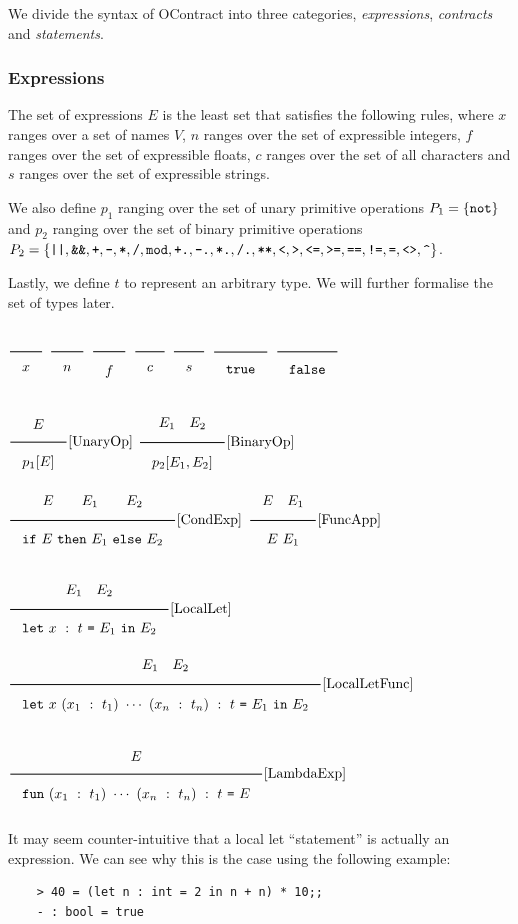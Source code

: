 \documentclass[a4paper]{article}
\newcommand{\Rule}[2]{\genfrac{}{}{0.7pt}{}{{\setlength{\fboxrule}{0pt}\setlength{\fboxsep}{3mm}\fbox{$#1$}}}{{\setlength{\fboxrule}{0pt}\setlength{\fboxsep}{3mm}\fbox{$#2$}}}}
\newcommand{\RuleWithName}[3]{\genfrac{}{}{0.7pt}{}{{\setlength{\fboxrule}{0pt}\setlength{\fboxsep}{3mm}\fbox{$#1$}}}{{\setlength{\fboxrule}{0pt}\setlength{\fboxsep}{3mm}\fbox{$#2$}}}[\text{#3}]}
\newcommand{\TruE}{\texttt{true}}
\newcommand{\FalsE}{\texttt{false}}
\begin{document}
We divide the syntax of OContract into three categories, \textit{expressions}, \textit{contracts} and \textit{statements}.

\subsubsection*{Expressions}

The set of expressions $E$ is the least set that satisfies the following rules, where $x$ ranges over a set of names $V$,
$n$ ranges over the set of expressible integers, $f$ ranges over the set of expressible floats, $c$ ranges over the
set of all characters and $s$ ranges over the set of expressible strings.

We also define $p_1$ ranging over the set of unary primitive operations $P_1=\{\verb|not|\}$
and $p_2$ ranging over the set of binary primitive operations $P_2=\{\verb@||@,\verb#&&#, \verb#+#, \verb#-#,\verb#*#,\verb#/#, \verb#mod#,
\verb#+.#, \verb#-.#,\verb#*.#,\verb#/.#, \verb#**#,\verb#<#, \verb#>#, \verb#<=#, \verb#>=#, \verb#==#, \verb#!=#, \verb#=#, \verb#<>#, \verb#^#\}$.

Lastly, we define $t$ to represent an arbitrary type.
We will further formalise the set of types later.

$\Rule{}{x}$
\hfill
$\Rule{}{n}$
\hfill
$\Rule{}{f}$
\hfill
$\Rule{}{c}$
\hfill
$\Rule{}{s}$
\hfill
$\Rule{}{\TruE}$
\hfill
$\Rule{}{\FalsE}$

$\RuleWithName{E}{p_1[E]}{UnaryOp}$
\hfill
$\RuleWithName{E_1\quad E_2}{p_2[E_1, E_2]}{BinaryOp}$
\hfill
$\RuleWithName{E\qquad E_1\qquad E_2}{\texttt{if}\ E\ \texttt{then}\ E_1\ \texttt{else}\ E_2}{CondExp}$
\hfill
$\RuleWithName{E\quad E_1}{E\ E_1}{FuncApp}$

$\RuleWithName{E_1\quad E_2}{\texttt{let}\ x\ :\ t\ \texttt{=}\ E_1\ \texttt{in}\ E_2}{LocalLet}$
\hfill
$\RuleWithName{E_1\quad E_2}{\texttt{let}\ x\ (x_1\ :\ t_1)\ \cdots\ (x_n\ :\ t_n)\ :\ t\ \texttt{=}\ E_1\ \texttt{in}\ E_2}{LocalLetFunc}$

$\RuleWithName{E}{\texttt{fun}\ (x_1\ :\ t_1)\ \cdots\ (x_n\ :\ t_n)\ :\ t\ \texttt{=}\ E}{LambdaExp}$

It may seem counter-intuitive that a local let ``statement'' is actually an expression.
We can see why this is the case using the following example:

\begin{verbatim}
    > 40 = (let n : int = 2 in n + n) * 10;;
    - : bool = true
\end{verbatim}
\end{document}
